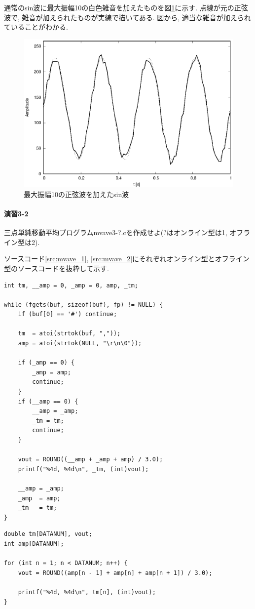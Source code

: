 \documentclass[titlepage]{jsarticle}
\begin{document}
        通常のsin波に最大振幅10の白色雑音を加えたものを図\ref{fig:sin_wn}に示す.
        点線が元の正弦波で, 雑音が加えられたものが実線で描いてある.
        図から, 適当な雑音が加えられていることがわかる.

        \begin{figure}[ht]
            \centering
            \includegraphics[width=12cm]{images/sin_wn.eps}
            \caption{最大振幅10の正弦波を加えたsin波}
            \label{fig:sin_wn}
        \end{figure}

    \paragraph{演習3-2} 三点単純移動平均プログラムmvave3-?.cを作成せよ(?はオンライン型は1,
    オフライン型は2).

        ソースコード\ref{src:mvave_1}, \ref{src:mvave_2}にそれぞれオンライン型とオフライン型のソースコードを抜粋して示す.

        \begin{lstlisting}[caption=mvave3-1.c, label=src:mvave_1]
int tm, __amp = 0, _amp = 0, amp, _tm;

while (fgets(buf, sizeof(buf), fp) != NULL) {
    if (buf[0] == '#') continue;
    
    tm  = atoi(strtok(buf, ","));
    amp = atoi(strtok(NULL, "\r\n\0"));

    if (_amp == 0) {
        _amp = amp;
        continue;
    }
    if (__amp == 0) {
        __amp = _amp;
        _tm = tm;
        continue;
    }

    vout = ROUND((__amp + _amp + amp) / 3.0);
    printf("%4d, %4d\n", _tm, (int)vout);

    __amp = _amp;
    _amp  = amp;
    _tm   = tm;
}\end{lstlisting}
        \begin{lstlisting}[caption=mvave3-2.c, label=src:mvave_2]
double tm[DATANUM], vout;
int amp[DATANUM];

for (int n = 1; n < DATANUM; n++) {
    vout = ROUND((amp[n - 1] + amp[n] + amp[n + 1]) / 3.0);

    printf("%4d, %4d\n", tm[n], (int)vout);
}\end{lstlisting}
\end{document}
